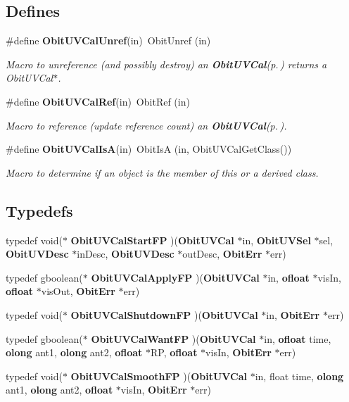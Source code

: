 \subsection*{Defines}
\begin{CompactItemize}
\item 
\#define {\bf Obit\-UVCal\-Unref}(in)\ Obit\-Unref (in)
\begin{CompactList}\small\item\em Macro to unreference (and possibly destroy) an {\bf Obit\-UVCal}{\rm (p.\,\pageref{structObitUVCal})} returns a Obit\-UVCal$\ast$. \item\end{CompactList}\item 
\#define {\bf Obit\-UVCal\-Ref}(in)\ Obit\-Ref (in)
\begin{CompactList}\small\item\em Macro to reference (update reference count) an {\bf Obit\-UVCal}{\rm (p.\,\pageref{structObitUVCal})}. \item\end{CompactList}\item 
\#define {\bf Obit\-UVCal\-Is\-A}(in)\ Obit\-Is\-A (in, Obit\-UVCal\-Get\-Class())
\begin{CompactList}\small\item\em Macro to determine if an object is the member of this or a derived class. \item\end{CompactList}\end{CompactItemize}
\subsection*{Typedefs}
\begin{CompactItemize}
\item 
typedef void($\ast$ {\bf Obit\-UVCal\-Start\-FP} )({\bf Obit\-UVCal} $\ast$in, {\bf Obit\-UVSel} $\ast$sel, {\bf Obit\-UVDesc} $\ast$in\-Desc, {\bf Obit\-UVDesc} $\ast$out\-Desc, {\bf Obit\-Err} $\ast$err)
\item 
typedef gboolean($\ast$ {\bf Obit\-UVCal\-Apply\-FP} )({\bf Obit\-UVCal} $\ast$in, {\bf ofloat} $\ast$vis\-In, {\bf ofloat} $\ast$vis\-Out, {\bf Obit\-Err} $\ast$err)
\item 
typedef void($\ast$ {\bf Obit\-UVCal\-Shutdown\-FP} )({\bf Obit\-UVCal} $\ast$in, {\bf Obit\-Err} $\ast$err)
\item 
typedef gboolean($\ast$ {\bf Obit\-UVCal\-Want\-FP} )({\bf Obit\-UVCal} $\ast$in, {\bf ofloat} time, {\bf olong} ant1, {\bf olong} ant2, {\bf ofloat} $\ast$RP, {\bf ofloat} $\ast$vis\-In, {\bf Obit\-Err} $\ast$err)
\item 
typedef void($\ast$ {\bf Obit\-UVCal\-Smooth\-FP} )({\bf Obit\-UVCal} $\ast$in, float time, {\bf olong} ant1, {\bf olong} ant2, {\bf ofloat} $\ast$vis\-In, {\bf Obit\-Err} $\ast$err)
\end{CompactItemize}
